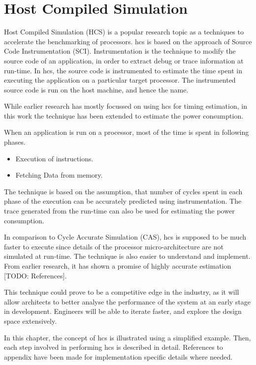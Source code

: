 \chapter{Host Compiled Simulation}

Host Compiled Simulation (HCS) is a popular research topic as a techniques to accelerate the benchmarking of processors. \gls{hcs} is based on the approach of Source Code Instrumentation (SCI). Instrumentation is the technique to modify the source code of an application, in order to extract debug or trace information at run-time. In \gls{hcs}, the source code is instrumented to estimate the time spent in executing the application on a particular target processor. The instrumented source code is run on the host machine, and hence the name.

While earlier research has mostly focussed on using \gls{hcs} for timing estimation, in this work the technique has been extended to estimate the power consumption.

When an application is run on a processor, most of the time is spent in following phases.

\begin{itemize} \itemsep -6pt
\item Execution of instructions.
\item Fetching Data from memory.
\end{itemize}

The technique is based on the assumption, that number of cycles spent in each phase of the execution can be accurately predicted using instrumentation. The trace generated from the run-time can also be used for estimating the power consumption.

In comparison to Cycle Accurate Simulation (CAS), \gls{hcs} is supposed to be much faster to execute since details of the processor micro-architecture are not simulated at run-time. The technique is also easier to understand and implement. From earlier research, it has shown a promise of highly accurate estimation [TODO: References].

This technique could prove to be a competitive edge in the industry, as it will allow architects to better analyse the performance of the system at an early stage in development. Engineers will be able to iterate faster, and explore the design space extensively.

In this chapter, the concept of \gls{hcs} is illustrated using a simplified example. Then, each step involved in performing \gls{hcs} is described in detail. References to appendix have been made for implementation specific details where needed.

